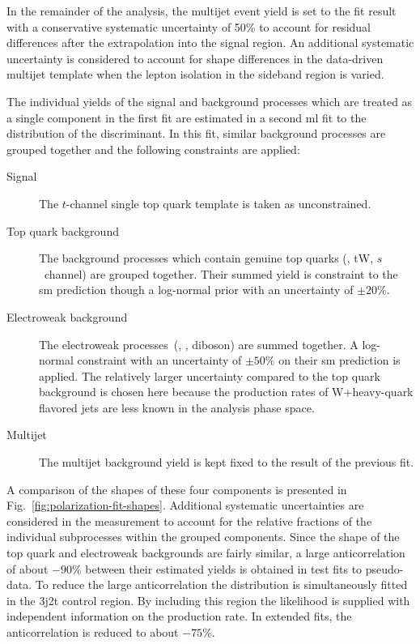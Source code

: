 In the remainder of the analysis, the multijet event yield is set to the fit result with a conservative systematic uncertainty of 50\% to account for residual differences after the extrapolation into the signal region. An additional systematic uncertainty is considered to account for shape differences in the data-driven multijet template when the lepton isolation in the sideband region is varied.

The individual yields of the signal and background processes which are treated as a single component in the first fit are estimated in a second \gls{ml} fit to the distribution of the \bdttch discriminant. In this fit, similar background processes are grouped together and the following constraints are applied:

\begin{description}
\item[Signal] The $t$-channel single top quark template is taken as unconstrained.
\item[Top quark background] The background processes which contain genuine top quarks (\ttbar, tW, $s$~channel) are grouped together. Their summed yield is constraint to the \gls{sm} prediction though a log-normal prior with an uncertainty of $\pm20\%$.
\item[Electroweak background] The electroweak processes~(\wjets, \zjets, diboson) are summed together. A log-normal constraint with an uncertainty of $\pm50\%$ on their \gls{sm} prediction is applied. The relatively larger uncertainty compared to the top quark background is chosen here because the production rates of W+heavy-quark flavored jets are less known in the analysis phase space.
\item[Multijet] The multijet background yield is kept fixed to the result of the previous fit.
\end{description}

A comparison of the shapes of these four components is presented in Fig.~\ref{fig:polarization-fit-shapes}. Additional systematic uncertainties are considered in the measurement to account for the relative fractions of the individual subprocesses within the grouped components. Since the \bdttch shape of the top quark and electroweak backgrounds are fairly similar, a large anticorrelation of about $-90\%$ between their estimated yields is obtained in test fits to pseudo-data. To reduce the large anticorrelation the \bdttch distribution is simultaneously fitted in the 3j2t control region. By including this region the likelihood is supplied with independent information on the \ttbar production rate. In extended fits, the anticorrelation is reduced to about $-75\%$.

